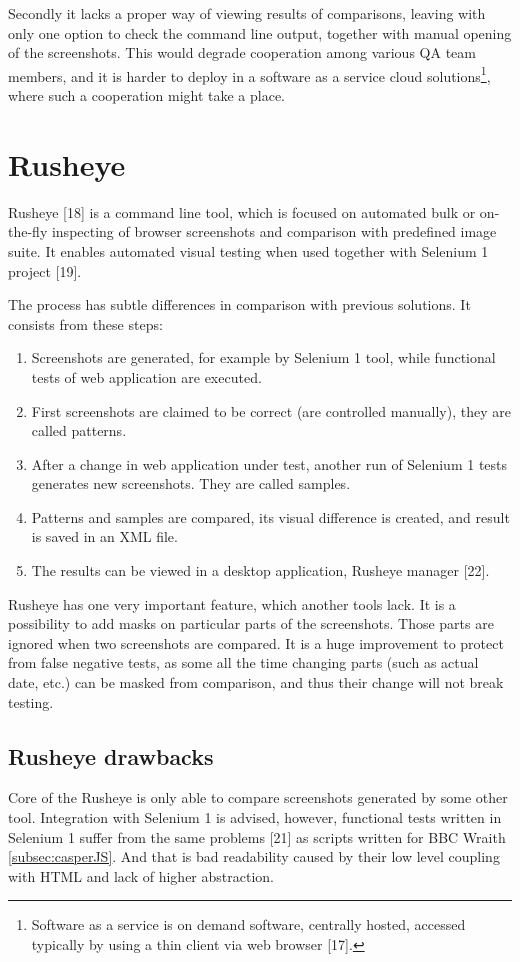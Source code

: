 \documentclass[11pt,oneside,final]{fithesis2}
\begin{document}
   Secondly it lacks a proper way of viewing results of comparisons, leaving with only one option to check the command line output, together with manual opening of the screenshots. This would degrade
   cooperation among various QA team members, and it is harder to deploy in a software as a service cloud solutions\footnote{Software as a service is on demand software, centrally hosted, 
   accessed typically by using a thin client via web browser [17].}, where such a cooperation might take a place.

  \section{Rusheye}
  \label{sec:rusheye}
  Rusheye [18] is a command line tool, which is focused on automated bulk or on-the-fly inspecting of browser screenshots and comparison with predefined image suite. It enables automated
  visual testing when used together with Selenium 1 project [19].
  
  The process has subtle differences in comparison with previous solutions. It consists from these steps:
  
  \begin{enumerate}
   \item Screenshots are generated, for example by Selenium 1 tool, while functional tests of web application are executed.
   \item First screenshots are claimed to be correct (are controlled manually), they are called patterns.
   \item After a change in web application under test, another run of Selenium 1 tests generates new screenshots. They are called samples.
   \item Patterns and samples are compared, its visual difference is created, and result is saved in an XML file.
   \item The results can be viewed in a desktop application, Rusheye manager [22].
  \end{enumerate}
  
  Rusheye has one very important feature, which another tools lack. It is a possibility to add masks on particular parts of the screenshots. Those parts are ignored when two screenshots are
  compared. It is a huge improvement to protect from false negative tests, as some all the time changing parts (such as actual date, etc.) can be masked from comparison, and thus their change
  will not break testing.
  
  \subsection{Rusheye drawbacks}
  Core of the Rusheye is only able to compare screenshots generated by some other tool. Integration with Selenium 1 is advised, however, functional tests written in Selenium 1 suffer
  from the same problems [21] as scripts written for BBC Wraith \ref{subsec:casperJS}. And that is bad readability caused by their low level coupling with HTML and lack of higher abstraction.
  
\end{document}
